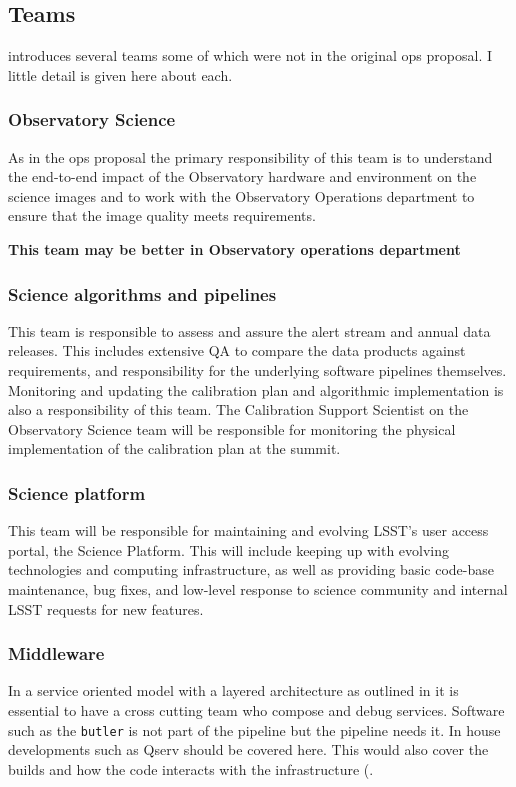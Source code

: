 
\subsection{Teams }\label{sec:teams}
 introduces several teams some of which were not in the original ops proposal. I  little detail is given here about each.

\subsubsection{Observatory Science}
As in the ops proposal the primary responsibility of this team is to understand the end-to-end impact of the Observatory hardware and environment on the science images and to work with the Observatory Operations department to ensure that the image quality meets requirements.

\textbf{This team may be better  in Observatory operations department }

\subsubsection{Science algorithms and pipelines}
This team is responsible to assess and assure the alert stream and annual data releases. This includes extensive QA to compare the data products against requirements, and responsibility for the underlying software pipelines themselves. Monitoring and updating the calibration plan and algorithmic implementation is also a responsibility of this team. The Calibration Support Scientist on the Observatory Science team will be responsible for monitoring the physical implementation of the calibration plan at the summit.

\subsubsection{Science platform  }
This team will be responsible for maintaining and evolving LSST’s user access portal, the Science Platform. This will include keeping up with evolving technologies and computing infrastructure, as well as providing basic code-base maintenance, bug fixes, and low-level response to science community and internal LSST requests for new features.

\subsubsection{Middleware }
In a service oriented model with a layered architecture as outlined in  it is essential to have a cross cutting team who compose and debug services.
Software such as the \texttt{butler}  is not part of the pipeline but the pipeline needs it. In house developments such as Qserv should be covered here.
This would also cover the builds and how the code interacts with the infrastructure (.


